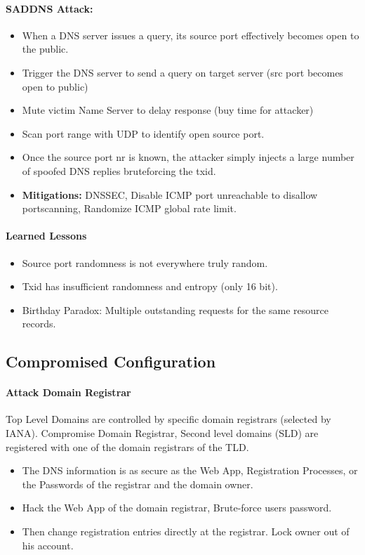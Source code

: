 \paragraph{SADDNS Attack:}
\begin{itemize}
    \item When a DNS server issues a query, its source port effectively becomes open to the public.
    \item Trigger the DNS server to send a query on target server (src port becomes open to public)
    \item Mute victim Name Server to delay response (buy time for attacker)
    \item Scan port range with UDP to identify open source port.
    \item Once the source port nr is known, the attacker simply injects a large number of spoofed DNS replies bruteforcing the txid.
    \item \textbf{Mitigations:} DNSSEC, Disable ICMP port unreachable to disallow portscanning, Randomize ICMP global rate limit.
\end{itemize}

\paragraph{Learned Lessons}
\begin{itemize}
    \item Source port randomness is not everywhere truly random.
    \item Txid has insufficient randomness and entropy (only 16 bit).
    \item Birthday Paradox: Multiple outstanding requests for the same resource records.
\end{itemize}

\subsection{Compromised Configuration}

\paragraph{Attack Domain Registrar}
Top Level Domains are controlled by specific domain registrars (selected by IANA). Compromise Domain Registrar, Second level domains (SLD) are registered with one of the domain registrars of the TLD.

\begin{itemize}
    \item The DNS information is as secure as the Web App, Registration Processes, or the Passwords of the registrar and the domain owner.
    \item Hack the Web App of the domain registrar, Brute-force users password.
    \item Then change registration entries directly at the registrar. Lock owner out of his account.
\end{itemize}

